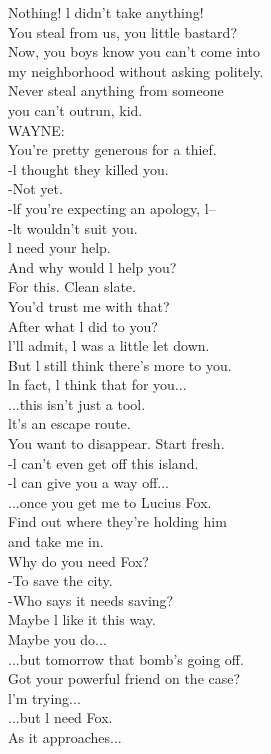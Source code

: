 \documentclass{article}
\begin{document}
\begin{multicols}{3}
Nothing! l didn't take anything!\\
You steal from us, you little bastard?\\
Now, you boys know you can't come into\\
my neighborhood without asking politely.\\
Never steal anything from someone\\
you can't outrun, kid.\\
WAYNE:\\
You're pretty generous for a thief.\\
-l thought they killed you.\\
-Not yet.\\
-lf you're expecting an apology, l--\\
-lt wouldn't suit you.\\
l need your help.\\
And why would l help you?\\
For this. Clean slate.\\
You'd trust me with that?\\
After what l did to you?\\
l'll admit, l was a little let down.\\
But l still think there's more to you.\\
ln fact, l think that for you...\\
...this isn't just a tool.\\
lt's an escape route.\\
You want to disappear. Start fresh.\\
-l can't even get off this island.\\
-l can give you a way off...\\
...once you get me to Lucius Fox.\\
Find out where they're holding him\\
and take me in.\\
Why do you need Fox?\\
-To save the city.\\
-Who says it needs saving?\\
Maybe l like it this way.\\
Maybe you do...\\
...but tomorrow that bomb's going off.\\
Got your powerful friend on the case?\\
l'm trying...\\
...but l need Fox.\\
As it approaches...\\

\end{multicols}
\end{document}
